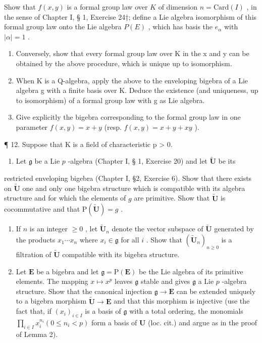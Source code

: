 Show that \(f(x, y)\) is a formal group law over \(K\) of dimension \(n = \text{Card}(I)\) , in the sense of Chapter I, § 1, Exercise 24†; define a Lie algebra isomorphism of this formal group law onto the Lie algebra \(P(E)\) , which has basis the \(e_{\alpha}\) with \(|\alpha| = 1\) .

\begin{enumerate}
\def\labelenumi{(\alph{enumi})}
\setcounter{enumi}{2}
\item
  Conversely, show that every formal group law over K in the x and y can be obtained by the above procedure, which is unique up to isomorphism.
\item
  When K is a Q-algebra, apply the above to the enveloping bigebra of a Lie algebra g with a finite basis over K. Deduce the existence (and uniqueness, up to isomorphism) of a formal group law with g as Lie algebra.
\item
  Give explicitly the bigebra corresponding to the formal group law in one parameter \(f(x, y) = x + y\) (resp. \(f(x, y) = x + y + xy\) ).
\end{enumerate}

¶ 12. Suppose that K is a field of characteristic p > 0.

\begin{enumerate}
\def\labelenumi{(\alph{enumi})}
\tightlist
\item
  Let \(\mathfrak{g}\) be a Lie \(p\) -algebra (Chapter I, § 1, Exercise 20) and let \(\tilde{\mathbf{U}}\) be its
\end{enumerate}


restricted enveloping bigebra (Chapter I, §2, Exercise 6). Show that there exists on \(\tilde{\mathbf{U}}\) one and only one bigebra structure which is compatible with its algebra structure and for which the elements of \(g\) are primitive. Show that \(\tilde{\mathbf{U}}\) is cocommutative and that \(\mathrm{P}(\tilde{\mathbf{U}}) = g\) .

\begin{enumerate}
\def\labelenumi{(\alph{enumi})}
\setcounter{enumi}{1}
\item
  If \(n\) is an integer \(\geqslant 0\) , let \(\tilde{\mathbf{U}}_n\) denote the vector subspace of \(\tilde{\mathbf{U}}\) generated by the products \(x_1\cdots x_n\) where \(x_i \in \mathfrak{g}\) for all \(i\) . Show that \((\tilde{\mathbf{U}}_n)_{n \geqslant 0}\) is a filtration of \(\tilde{\mathbf{U}}\) compatible with its bigebra structure.
\item
  Let \(\mathbf{E}\) be a bigebra and let \(\mathfrak{g} = \mathrm{P}(\mathbf{E})\) be the Lie algebra of its primitive elements. The mapping \(x\mapsto x^p\) leaves \(\mathfrak{g}\) stable and gives \(\mathfrak{g}\) a Lie \(p\) -algebra structure. Show that the canonical injection \(\mathfrak{g}\to \mathbf{E}\) can be extended uniquely to a bigebra morphism \(\tilde{\mathbf{U}}\rightarrow \mathbf{E}\) and that this morphism is injective (use the fact that, if \((x_{i})_{i\in I}\) is a basis of \(\mathfrak{g}\) with a total ordering, the monomials \(\prod_{i\in I}x_i^{n_i}(0\leqslant n_i < p)\) form a basis of \(\mathbf{U}\) (loc. cit.) and argue as in the proof of Lemma 2).
\end{enumerate}
\relax{}
